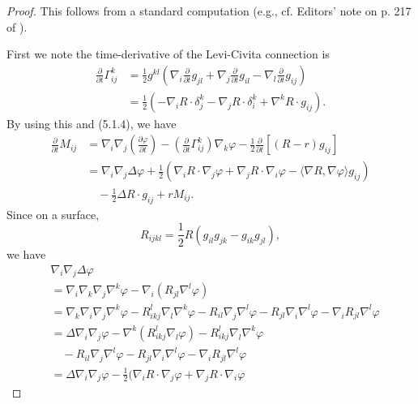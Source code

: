 \begin{proof} This follows from a standard computation
(e.g., cf. Editors' note on p. 217 of \cite{CCCY}).

First we note the time-derivative of the Levi-Civita connection is
\begin{displaymath}
\begin{split}
\frac{\partial}{\partial t}\Gamma^k_{ij} &
=\frac{1}{2}g^{kl}\left(\nabla_i\frac{\partial}{\partial t}g_{jl}
+\nabla_j\frac{\partial}{\partial t}g_{il}
-\nabla_l\frac{\partial}{\partial t}g_{ij}\right)\\
&  =\frac{1}{2}\left(-\nabla_iR\cdot\delta_j^k
-\nabla_jR\cdot\delta_i^k+\nabla^kR\cdot g_{ij}\right).
\end{split}
\end{displaymath}
By using this and (5.1.4), we have
\begin{displaymath}
\begin{split}
  \frac{\partial}{\partial t}M_{ij}
& = \nabla_i\nabla_j\left(\frac{\partial \varphi}{\partial t}\right)
    -\left(\frac{\partial}{\partial t}\Gamma^k_{ij}\right)\nabla_k\varphi
    -\frac{1}{2}\frac{\partial}{\partial t}[(R-r)g_{ij}]\\
& = \nabla_i\nabla_j\Delta\varphi
+\frac{1}{2}(\nabla_iR\cdot\nabla_j\varphi
    +\nabla_jR\cdot\nabla_i\varphi
-\langle\nabla R,\nabla\varphi\rangle g_{ij})\\
& \quad -\frac{1}{2}\Delta R\cdot g_{ij}+rM_{ij}.
\end{split}
\end{displaymath}
Since on a surface,
$$
R_{ijkl}=\frac{1}{2}R(g_{il}g_{jk}-g_{ik}g_{jl}),
$$
we have
\begin{displaymath}
\begin{split}
& \nabla_i\nabla_j\Delta\varphi \\
& = \nabla_i\nabla_k\nabla_j\nabla^k\varphi
-\nabla_i(R_{jl}\nabla^l\varphi)\\
& = \nabla_k\nabla_i\nabla_j\nabla^k\varphi
-R^l_{ikj}\nabla_l\nabla^k\varphi-R_{il}\nabla_j\nabla^l\varphi
    -R_{jl}\nabla_i\nabla^l\varphi
-\nabla_iR_{jl}\nabla^l\varphi\\
& = \Delta\nabla_i\nabla_j\varphi
-\nabla^k(R^l_{ikj}\nabla_l\varphi)-R^l_{ikj}\nabla_l\nabla^k\varphi\\
&\quad  -R_{il}\nabla_j\nabla^l\varphi
-R_{jl}\nabla_i\nabla^l\varphi-\nabla_iR_{jl}\nabla^l\varphi\\
& = \Delta\nabla_i\nabla_j\varphi
-\frac{1}{2}(\nabla_iR\cdot\nabla_j\varphi+\nabla_jR\cdot\nabla_i\varphi

\end{split}
\end{displaymath}
\end{proof}

